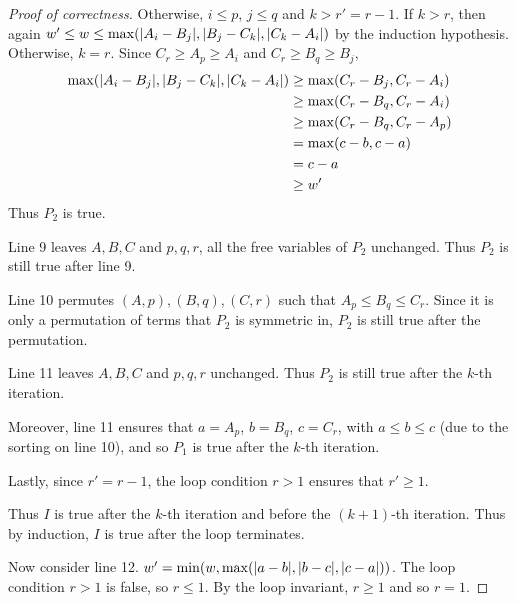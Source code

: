 \documentclass[12pt]{article}
\begin{document}
\begin{solution}
\begin{enumerate}[wide]
\begin{proof}[Proof of correctness]
                Otherwise, $i \leq p$, $j \leq q$ and $k > r' = r - 1$.
                If $k > r$, then again
                $w' \leq w \leq \max(\abs{A_{i} - B_{j}}, \abs{B_{j} - C_{k}}, \abs{C_{k} - A_{i}})$
                by the induction hypothesis.
                Otherwise, $k = r$.
                Since $C_{r} \geq A_{p} \geq A_{i}$ and $C_{r} \geq B_{q} \geq B_{j}$,
                \begin{align*}
                    \max(\abs{A_{i} - B_{j}}, \abs{B_{j} - C_{k}}, \abs{C_{k} - A_{i}})
                        &\geq \max(C_{r} - B_{j}, C_{r} - A_{i}) \\
                        &\geq \max(C_{r} - B_{q}, C_{r} - A_{i}) \\
                        &\geq \max(C_{r} - B_{q}, C_{r} - A_{p}) \\
                        &= \max(c - b, c - a) \\
                        &= c - a \\
                        &\geq w'
                \end{align*}
                Thus $P_2$ is true.

                Line 9 leaves $A, B, C$ and $p, q, r$, all the free variables of $P_2$
                unchanged.
                Thus $P_2$ is still true after line 9.

                Line 10 permutes $(A, p), (B, q), (C, r)$ such that $A_{p} \leq B_{q} \leq C_{r}$.
                Since it is only a permutation of terms that $P_2$ is symmetric in,
                $P_2$ is still true after the permutation.

                Line 11 leaves $A, B, C$ and $p, q, r$ unchanged.
                Thus $P_2$ is still true after the $k$-th iteration.

                Moreover, line 11 ensures that $a = A_{p}$, $b = B_{q}$, $c = C_{r}$,
                with $a \leq b \leq c$ (due to the sorting on line 10),
                and so $P_1$ is true after the $k$-th iteration.
                
                Lastly, since $r' = r - 1$, the loop condition $r > 1$ ensures
                that $r' \geq 1$.

                Thus $I$ is true after the $k$-th iteration and before the
                $(k + 1)$-th iteration.
                Thus by induction, $I$ is true after the loop terminates.

                Now consider line 12.
                $w' = \min(w, \max(\abs{a - b}, \abs{b - c}, \abs{c - a}))$.
                The loop condition $r > 1$ is false, so $r \leq 1$.
                By the loop invariant, $r \geq 1$ and so $r = 1$.
                

\end{proof}
\end{enumerate}
\end{solution}
\end{document}

